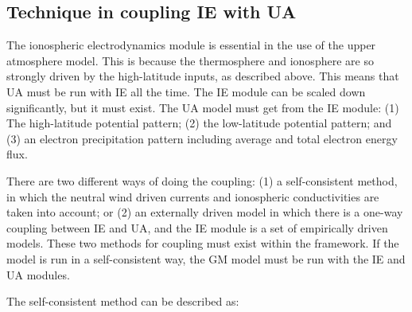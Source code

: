 \documentclass[twoside,10pt]{article}
\begin{document}
\subsection{Technique in coupling IE with UA}

The ionospheric electrodynamics module is essential in the use of the
upper atmosphere model.  This is because the thermosphere and
ionosphere are so strongly driven by the high-latitude inputs, as
described above.  This means that UA must be run with IE all the time.
The IE module can be scaled down significantly, but it must exist.
The UA model must get from the IE module: (1) The high-latitude
potential pattern; (2) the low-latitude potential pattern; and (3) an
electron precipitation pattern including average and total electron
energy flux.

There are two different ways of doing the coupling: (1) a
self-consistent method, in which the neutral wind driven currents and
ionospheric conductivities are taken into account; or (2) an
externally driven model in which there is a one-way coupling between
IE and UA, and the IE module is a set of empirically driven models.
These two methods for coupling must exist within the framework.  If
the model is run in a self-consistent way, the GM model must be
run with the IE and UA modules.

The self-consistent method can be described as:
\end{document}
